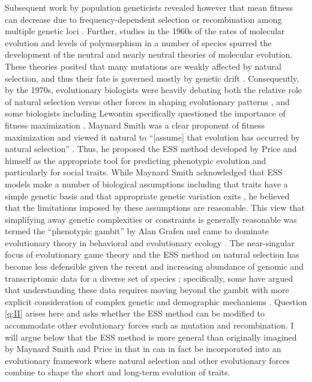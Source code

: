 \documentclass[11pt]{article}
\begin{document}
Subsequent work by population geneticists revealed however that mean fitness can decrease due to frequency-dependent selection \cite{Wright:1955,Lewontin:1970} or recombination among multiple genetic loci \cite{Kojima:Kelleher:1961,Moran:1964,Karlin:1975,Akin:1979}. Further, studies in the 1960s of the rates of molecular evolution \cite{Zuckerkandl:Pauling:1965,King:Jukes:1969} and levels of polymorphism \cite{Harris:1966,Lewontin:Hubby:1966} in a number of species spurred the development of the neutral \cite{Kimura:1968,Kimura:1983:book} and nearly neutral \cite{Ohta:1974,Ohta:1992} theories \cite{Ohta:Gillespie:1996} of molecular evolution. These theories posited that many mutations are weakly affected by natural selection, and thus their fate is governed mostly by genetic drift \cite{Kimura:1983:book}. Consequently, by the 1970s, evolutionary biologists were heavily debating both the relative role of natural selection versus other forces in shaping evolutionary patterns \cite{Gillespie:Langley:1974,Gillespie:1978}, and some biologists including Lewontin specifically questioned the importance of fitness maximization \cite{Karlin:1975,Gould:Lewontin:1979}. Maynard Smith was a clear proponent of fitness maximization and viewed it natural to ``[assume] that evolution has occurred by natural selection'' \cite[p. 31]{MaynardSmith:1978}. Thus, he proposed the ESS method developed by Price and himself as the appropriate tool for predicting phenotypic evolution and particularly for social traits. While Maynard Smith acknowledged that ESS models make a number of biological assumptions including that traits have a simple genetic basis and that appropriate genetic variation exits \cite{MaynardSmith:1978}, he believed that the limitations imposed by these assumptions are reasonable. This view that simplifying away genetic complexities or constraints is generally reasonable was termed the ``phenotypic gambit'' by Alan Grafen \cite{Grafen:1984} and came to dominate evolutionary theory in behavioral and evolutionary ecology \cite{Houston:McNamara:1999}. The near-singular focus of evolutionary game theory and the ESS method on natural selection has become less defensible given the recent and increasing abundance of genomic and transcriptomic data for a diverse set of species \cite[e.g.,][]{Kapheim:Pan:2015,Mikheyev:Linksvayer:2015,Warner:Mikheyev:2017,Kocher:Mallarino:2018,Warner:Mikheyev:2019}; specifically, some have argued that understanding these data requires moving beyond the gambit with more explicit consideration of complex genetic and demographic mechanisms \cite[e.g.,][]{Springer:Crespi:2011,Rittschof:Robinson:2014,Akcay:Linksvayer:2015,Cunningham:2020}. Question \ref{q:II} arises here and asks whether the ESS method can be modified to accommodate other evolutionary forces such as mutation and recombination. I will argue below that the ESS method is more general than originally imagined by Maynard Smith and Price \cite{Maynard-Smith:Price:1973} in that in can in fact be incorporated into an evolutionary framework where natural selection and other evolutionary forces combine to shape the short and long-term evolution of traits.
\end{document}
